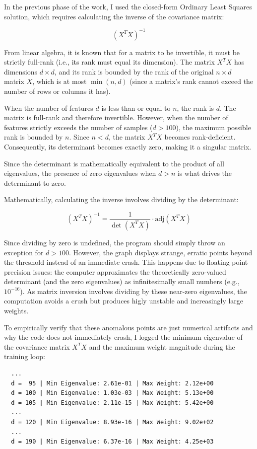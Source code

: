 \documentclass[11pt,a4paper]{article}
\begin{document}
In the previous phase of the work, I used the closed-form Ordinary Least Squares solution, which requires calculating the inverse of the covariance matrix:

\[
(X^T X)^{-1}
\]

From linear algebra, it is known that for a matrix to be invertible, it must be strictly full-rank (i.e., its rank must equal its dimension). The matrix $X^T X$ has dimensions $d \times d$, and its rank is bounded by the rank of the original $n \times d$ matrix $X$, which is at most $\min(n, d)$ (since a matrix's rank cannot exceed the number of rows or columns it has).

When the number of features $d$ is less than or equal to $n$, the rank is $d$. The matrix is full-rank and therefore invertible. However, when the number of features strictly exceeds the number of samples ($d > 100$), the maximum possible rank is bounded by $n$. Since $n < d$, the matrix $X^T X$ becomes rank-deficient. Consequently, its determinant becomes exactly zero, making it a singular matrix.

Since the determinant is mathematically equivalent to the product of all eigenvalues, the presence of zero eigenvalues when $d > n$ is what drives the determinant to zero.

Mathematically, calculating the inverse involves dividing by the determinant:

\[
(X^T X)^{-1} = \frac{1}{\det(X^T X)} \cdot \text{adj}(X^T X)
\]

Since dividing by zero is undefined, the program should simply throw an exception for $d > 100$. However, the graph displays strange, erratic points beyond the threshold instead of an immediate crash. This happens due to floating-point precision issues: the computer approximates the theoretically zero-valued determinant (and the zero eigenvalues) as infinitesimally small numbers (e.g., $10^{-16}$). As matrix inversion involves dividing by these near-zero eigenvalues, the computation avoids a crush but produces higly unstable and increasingly large weights.

To empirically verify that these anomalous points are just numerical artifacts and why the code does not immediately crash, I logged the minimum eigenvalue of the covariance matrix $X^T X$ and the maximum weight magnitude during the training loop:

\begin{center}
\begin{verbatim}
  ...
  d =  95 | Min Eigenvalue: 2.61e-01 | Max Weight: 2.12e+00
  d = 100 | Min Eigenvalue: 1.03e-03 | Max Weight: 5.13e+00
  d = 105 | Min Eigenvalue: 2.11e-15 | Max Weight: 5.42e+00
  ...
  d = 120 | Min Eigenvalue: 8.93e-16 | Max Weight: 9.02e+02
  ...
  d = 190 | Min Eigenvalue: 6.37e-16 | Max Weight: 4.25e+03
\end{verbatim}
\end{center}
\end{document}
